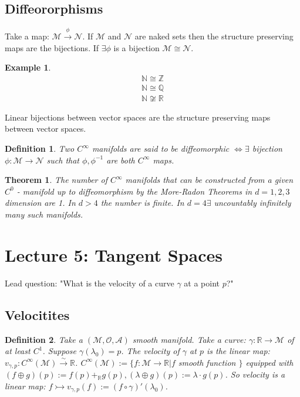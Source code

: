 \documentclass[10pt, oneside]{article}
\newcommand{\R}{\mathbb{R}}
\newcommand{\Z}{\mathbb{Z}}
\newcommand{\N}{\mathbb{N}}
\newcommand{\Q}{\mathbb{Q}}
\newcommand{\M}{\mathcal{M}}
\newtheorem{thm}{Theorem}
\newtheorem{defn}{Definition}
\newtheorem{example}{Example}
\begin{document}
  \subsection{Diffeororphisms}
     Take a map: $\M \xrightarrow{\phi} \mathcal{N}$. If $\M$ and $\mathcal{N}$ are naked sets then the structure preserving maps are the bijections. If $\exists \phi$ is a bijection $\M \cong \mathcal{N}$.
     \begin{example}
     \begin{align*}
        \N \cong \Z \\
        \N \cong \Q \\
        \N \not \cong \R
     \end{align*}
     \end{example}
     Linear bijections between vector spaces are the structure preserving maps between vector spaces.
     \begin{defn}
        Two $C^\infty$ manifolds are said to be diffeomorphic $\iff \exists$ bijection $\phi: \M \to \mathcal{N}$ such that $\phi, \phi^{-1}$ are both $C^\infty$ maps.
     \end{defn}
     \begin{thm}
        The number of $C^\infty$ manifolds that can be constructed from a given $C^0$ - manifold up to diffeomorphism by the More-Radon Theorems in $d = 1,2,3$ dimension are 1. In $d > 4$ the number is finite. In $d=4 \exists$ uncountably infinitely many such manifolds.
     \end{thm}
\section{Lecture 5: Tangent Spaces}
     Lead question: "What is the velocity of a curve $\gamma$ at a point $p$?"
  \subsection{Velocitites}
     \begin{defn}
        Take a $(\M,\mathcal{O}, \mathcal{A})$ smooth manifold. Take a curve: $\gamma: \R \to \M$ of at least $C^1$. Suppose $\gamma(\lambda_0) = p$.
        The velocity of $\gamma$ at $p$ is the linear map: $v_{\gamma,p}: C^{\infty}(\M) \xrightarrow{\sim} \R$. $C^\infty (\M) := \{f:\M \to \R | f $ smooth function $\}$ equipped with $(f \oplus g)(p) := f(p) +_{\R} g(p), (\lambda \oplus g)(p):=\lambda \cdot g(p)$.
        So velocity is a linear map: $f \rightarrowtail v_{\gamma,p} (f) := (f \circ \gamma)'(\lambda_0)$.
     \end{defn}
\end{document}
